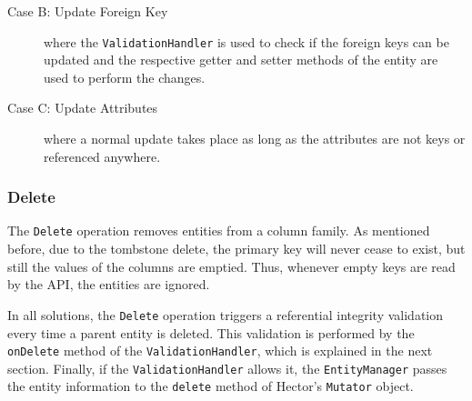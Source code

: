 \begin{description}
		
		
			\item [Case B: Update  Foreign Key]  where  the \texttt{ValidationHandler}
			is used to check if the foreign keys can be updated and
			the respective getter and setter methods of the entity are used to perform the
			changes. 
			
			\item [Case C: Update Attributes]  where a normal update takes place as long as
			the attributes  are not keys or referenced anywhere.
			
		\end{description}
		
		
% 		
% 		 
		
		
		\subsubsection{Delete}\label{ss:delete}
		The  \texttt{Delete} operation removes  entities from a column
		family.  As mentioned before,  due to the tombstone delete,  the primary key
		will never cease to exist,  but still the values of the columns are emptied.
		Thus, whenever empty keys are read by the \ac{API}, the entities are ignored.
		
		In all solutions,   the \texttt{Delete} operation triggers a referential
		integrity validation every time a parent entity is deleted.   This validation is
		performed by the \texttt{onDelete} method of the \texttt{ValidationHandler}, 
		which is explained in the next section.   Finally,  if the
		\texttt{ValidationHandler} allows it, the \texttt{EntityManager} passes the
		entity information to the \texttt{delete} method of Hector's \texttt{Mutator} object. 
 		
